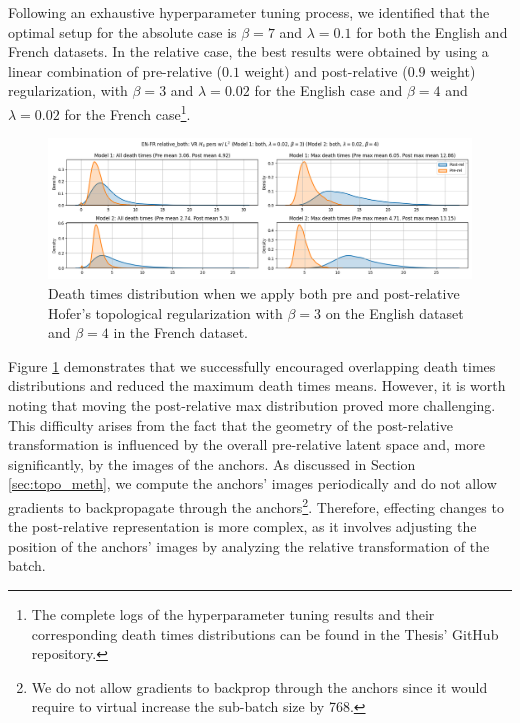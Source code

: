 \documentclass[../main.tex]{subfiles}
\begin{document}
Following an exhaustive hyperparameter tuning process, we identified that the optimal setup for the absolute case is $\beta=7$ and $\lambda=0.1$ for both the English and French datasets. In the relative case, the best results were obtained by using a linear combination of pre-relative ($0.1$ weight) and post-relative ($0.9$ weight) regularization, with $\beta=3$ and $\lambda=0.02$ for the English case and $\beta=4$ and $\lambda=0.02$ for the French case\footnote{The complete logs of the hyperparameter tuning results and their corresponding death times distributions can be found in the Thesis' GitHub repository.}.


\begin{figure}[ht!]
    \centering
    \includegraphics[width=\textwidth]{figures/rs/stitching/en_fr_relative_both_both_both_3_4_seed1.png} 
    \caption{Death times distribution when we apply both pre and post-relative Hofer's topological regularization with $\beta=3$ on the English dataset and $\beta=4$ in the French dataset.}
    \label{fig:distBoth}
\end{figure}


Figure \ref{fig:distBoth} demonstrates that we successfully encouraged overlapping death times distributions and reduced the maximum death times means. However, it is worth noting that moving the post-relative max distribution proved more challenging. This difficulty arises from the fact that the geometry of the post-relative transformation is influenced by the overall pre-relative latent space and, more significantly, by the images of the anchors. As discussed in Section \ref{sec:topo_meth}, we compute the anchors' images periodically and do not allow gradients to backpropagate through the anchors\footnote{We do not allow gradients to backprop through the anchors since it would require to virtual increase the sub-batch size by 768.}. Therefore, effecting changes to the post-relative representation is more complex, as it involves adjusting the position of the anchors' images by analyzing the relative transformation of the batch.\\
\end{document}
